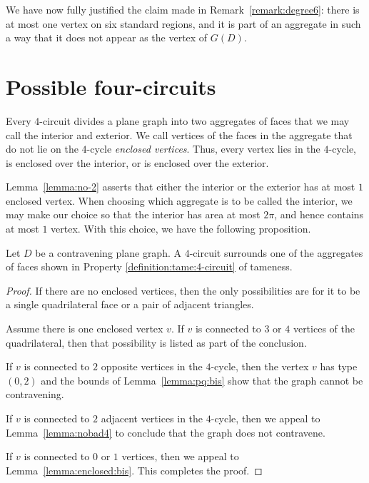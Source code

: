 \begin{remark}
We have now fully justified the claim made in
Remark~\ref{remark:degree6}: there is at most one vertex on six
standard regions, and it is part of an aggregate in such a way
that it does not appear as the vertex of $G(D)$.
\end{remark}


\section{Possible four-circuits}

Every $4$-circuit divides a plane graph into two aggregates of
faces that we may call the interior and exterior.  We call
vertices of the faces in the aggregate that do not lie on the
$4$-cycle {\it enclosed vertices}.  Thus, every vertex lies in the
$4$-cycle, is enclosed over the interior, or is enclosed over the
exterior.
%

Lemma~\ref{lemma:no-2} asserts that either the interior or the
exterior has at most $1$ enclosed vertex.   When choosing which
aggregate is to be called the interior, we may make our choice so
that the interior has area at most $2\pi$, and hence contains at
most $1$ vertex. With this choice, we have the following
proposition.

\begin{proposition}
Let $D$ be a contravening plane graph.  A $4$-circuit surrounds one
of the aggregates of faces shown in Property
    \ref{definition:tame:4-circuit} of tameness.
\end{proposition}

\begin{proof}
If there are no enclosed vertices, then the only possibilities are
for it to be a single quadrilateral face or a pair of adjacent
triangles.

Assume there is one enclosed vertex $v$.  If $v$ is connected to
$3$ or $4$ vertices of the quadrilateral, then that possibility is
listed as part of the conclusion.

If $v$ is connected to $2$ opposite vertices in the $4$-cycle,
then the vertex $v$ has type $(0,2)$ and the bounds of
Lemma~\ref{lemma:pq:bis} show that the graph cannot be
contravening.

If $v$ is connected to $2$ adjacent vertices in the $4$-cycle,
then we appeal to Lemma~\ref{lemma:nobad4} to conclude that the
graph does not contravene.

If $v$ is connected to $0$ or $1$ vertices, then we appeal to
Lemma~\ref{lemma:enclosed:bis}.  This completes the proof.
\end{proof}

